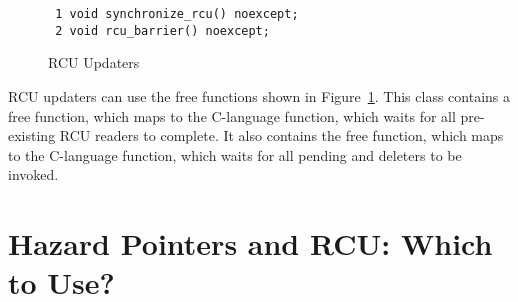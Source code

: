 \documentclass[letterpaper,10pt]{article}
\begin{document}
\begin{figure}[tbp]
{ \scriptsize
\begin{verbatim}
 1 void synchronize_rcu() noexcept;
 2 void rcu_barrier() noexcept;
\end{verbatim}
}
\caption{RCU Updaters}
\label{fig:RCU Updaters}
\end{figure}

RCU updaters can use the free functions shown in
Figure~\ref{fig:RCU Updaters}.
This class contains a  free function,
which maps to the C-language  function, which
waits for all pre-existing RCU readers to complete.
It also contains the  free function,
which maps to the C-language  function,
which waits for all pending  and 
deleters to be invoked.

\section{Hazard Pointers and RCU: Which to Use?}
\label{sec:Hazard Pointers and RCU: Which to Use?}
\end{document}
